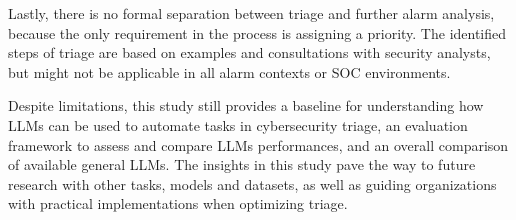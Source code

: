 Lastly, there is no formal separation between triage and further alarm analysis, because the only requirement in the
process is assigning a priority.
The identified steps of triage are based on examples and consultations with security analysts, but might not be
applicable in all alarm contexts or SOC environments.

Despite limitations, this study still provides a baseline for understanding how LLMs can be used to automate
tasks in cybersecurity triage, an evaluation framework to assess and compare LLMs performances, and an overall
comparison of available general LLMs.
The insights in this study pave the way to future research with other tasks, models and datasets, as well as
guiding organizations with practical implementations when optimizing triage.
